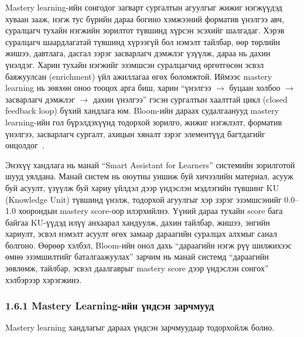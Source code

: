 \documentclass[12pt,A4]{report}
\newcommand{\eng}[1]{#1}
\begin{document}
Mastery learning-ийн сонгодог загварт сургалтын агуулгыг жижиг нэгжүүдэд хуваан зааж, нэгж тус бүрийн дараа богино хэмжээний форматив үнэлгээ авч, суралцагч тухайн нэгжийн зорилтот түвшинд хүрсэн эсэхийг шалгадаг. Хэрэв суралцагч шаардлагатай түвшинд хүрээгүй бол нэмэлт тайлбар, өөр төрлийн жишээ, давтлага, дасгал зэрэг засварлагч дэмжлэг үзүүлж, дараа нь дахин үнэлдэг. Харин тухайн нэгжийг эзэмшсэн суралцагчид өргөтгөсөн эсвэл баяжуулсан (\eng{enrichment}) үйл ажиллагаа өгөх боломжтой. Иймээс mastery learning нь зөвхөн оноо тооцох арга биш, харин ``үнэлгээ $\rightarrow$ буцаан холбоо $\rightarrow$ засварлагч дэмжлэг $\rightarrow$ дахин үнэлгээ'' гэсэн сургалтын хаалттай цикл (\eng{closed feedback loop}) бүхий хандлага юм. Bloom-ийн дараах судалгаанууд mastery learning-ийн гол бүрэлдэхүүнд тодорхой зорилго, жижиг нэгжлэлт, форматив үнэлгээ, засварлагч сургалт, ахицын хяналт зэрэг элементүүд багтдагийг онцолдог~\cite{guskey2005,guskey2007,deweese2011}.

Энэхүү хандлага нь манай ``Smart Assistant for Learners'' системийн зорилготой шууд уялдана. Манай систем нь оюутны уншиж буй хичээлийн материал, асууж буй асуулт, үзүүлж буй хариу үйлдэл дээр үндэслэн мэдлэгийн түвшинг KU (\eng{Knowledge Unit}) түвшинд үнэлж, тодорхой агуулгыг хэр зэрэг эзэмшсэнийг 0.0--1.0 хоорондын mastery score-оор илэрхийлнэ. Үүний дараа тухайн score бага байгаа KU-үүдэд илүү анхаарал хандуулж, дахин тайлбар, жишээ, энгийн хариулт, эсвэл нэмэлт асуулт өгөх замаар дараагийн суралцах алхмыг санал болгоно. Өөрөөр хэлбэл, Bloom-ийн онол дахь ``дараагийн нэгж рүү шилжихээс өмнө эзэмшилтийг баталгаажуулах'' зарчим нь манай системд ``дараагийн зөвлөмж, тайлбар, эсвэл даалгаврыг mastery score дээр үндэслэн сонгох'' хэлбэрээр хэрэгжинэ.

\subsubsection{1.6.1 Mastery Learning-ийн үндсэн зарчмууд}

Mastery learning хандлагыг дараах үндсэн зарчмуудаар тодорхойлж болно.
\end{document}

